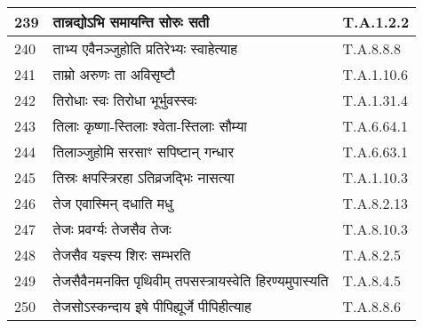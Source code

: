 \documentclass[17pt]{extarticle}
\begin{document}
\begin{longtable}{||p{0.4in}||p{4.9in}||p{0.9in}||}
    \hline
        
    239 & तान्नद्योऽभि समायन्ति सोरुः सती & T.A.1.2.2       \\
    
    \hline
        
    240 & ताभ्य एवैनञ्जुहोति प्रतिरेभ्यः स्वाहेत्याह & T.A.8.8.8       \\
    
    \hline
        
    241 & ताम्रो अरुणः ता अविसृष्टौ & T.A.1.10.6       \\
    
    \hline
        
    242 & तिरोधाः स्वः तिरोधा भूर्भुवस्स्वः & T.A.1.31.4       \\
    
    \hline
        
    243 & तिलाः कृष्णा{-}स्तिलाः श्वेता{-}स्तिलाः सौम्या & T.A.6.64.1       \\
    
    \hline
        
    244 & तिलाञ्जुहोमि सरसाꣳ सपिष्टान् गन्धार & T.A.6.63.1       \\
    
    \hline
        
    245 & तिस्रः क्षपस्त्रिरहा ऽतिव्रजद्भिः नासत्या & T.A.1.10.3       \\
    
    \hline
        
    246 & तेज एवास्मिन् दधाति मधु & T.A.8.2.13       \\
    
    \hline
        
    247 & तेजः प्रवर्ग्यः तेजसैव तेजः & T.A.8.10.3       \\
    
    \hline
        
    248 & तेजसैव यज्ञ्स्य शिरः सम्भरति & T.A.8.2.5       \\
    
    \hline
        
    249 & तेजसैवैनमनक्ति पृथिवीम् तपसस्त्रायस्वेति हिरण्यमुपास्यति & T.A.8.4.5       \\
    
    \hline
        
    250 & तेजसोऽस्कन्दाय इषे पीपिह्यूर्जे पीपिहीत्याह & T.A.8.8.6       \\
    
    \hline
        

\end{longtable}
\end{document}
